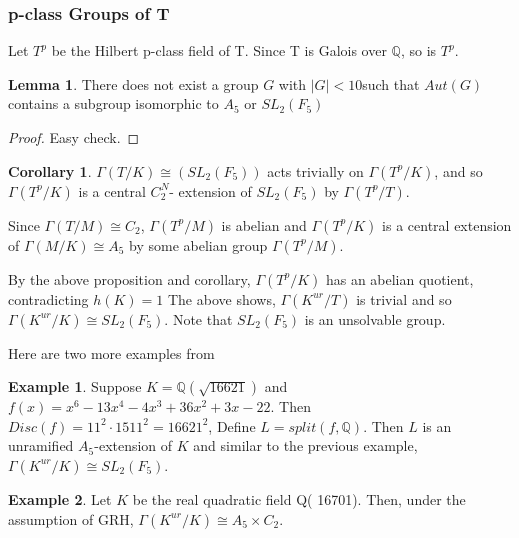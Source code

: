 \documentclass[12pt]{extarticle}
\newcommand{\Q}{\mathbb{Q}}
\newcommand{\<}{\langle}
\renewcommand{\>}{\rangle}
\theoremstyle{definition}
\newtheorem{corollary}{Corollary}
\newtheorem*{example}{Example}
\newtheorem{lemma}{Lemma}
\begin{document}
\subsubsection{p-class Groups of T}

Let $T^p$ be the Hilbert p-class field of T. Since T is Galois over $\Q$, so is $T^p$.
\begin{lemma}
There does not exist a group $G$ with $|G| < 10 $such that $Aut(G)$ contains a subgroup isomorphic to $A_5$ or $SL_2(F_5)$
\end{lemma}
\begin{proof}
Easy check. 
\end{proof}
\begin{corollary}
 $\Gamma(T/K) \cong (SL_2(F_5))$ acts trivially on $\Gamma(T^p/K)$, and so $\Gamma(T^p/K)$ is a central $C_2^N$- extension of $SL_2(F_5)$ by $\Gamma(T^p/T)$. \par
Since $\Gamma(T/M) \cong C_2$, $\Gamma(T^p/M)$ is abelian and $\Gamma(T^p/K)$ is a central extension of $\Gamma(M/K) \cong A_5$ by some abelian group $\Gamma(T^p/M)$.
\end{corollary}
 By the above proposition and corollary, $\Gamma(T^p/K)$ has an abelian quotient, contradicting $h(K)=1$
The above shows, $\Gamma(K^{ur}/T)$ is trivial and so $\Gamma(K^{ur}/K) \cong SL_2(F_5)$. Note that $SL_2(F_5)$ is an unsolvable group. 
 \par
Here are two more examples from \cite{KIM2017}
\begin{example}
Suppose $K = \Q(\sqrt{16621})$ and $f(x) = x^6-13x^4-4x^3 +36x^2 +3x-22$. Then $Disc(f) = 11^2 \cdot 1511^2 = 16621^2$, Define $L= split(f,\Q)$. Then $L$ is an unramified $A_5$-extension of $K$ and similar to the previous example, $\Gamma(K^{ur}/K) \cong SL_2(F_5)$.
\end{example}
\begin{example}
Let $K$ be the real quadratic field Q( 16701). Then, under the assumption of GRH,  $\Gamma(K^{ur}/K) \cong A_5 \times C_2$.
\end{example}
 







\end{document}
